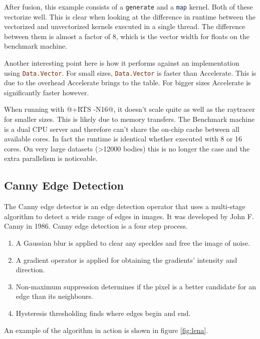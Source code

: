 \documentclass[a4paper,bibliography=totocnumbered,parskip,headsepline]{scrbook}
\begin{document}
After fusion, this example consists of a \lstinline[language=haskell]!generate! and a \lstinline[language=haskell]!map! kernel.
Both of these vectorize well.
This is clear when looking at the difference in runtime between the vectorized and unvectorized kernels executed in a single thread.
The difference between them is almost a factor of 8, which is the vector width for floats on the benchmark machine.

Another interesting point here is how it performs against an implementation using \lstinline[language=haskell]!Data.Vector!.
For small sizes, \lstinline[language=haskell]!Data.Vector! is faster than Accelerate.
This is due to the overhead Accelerate brings to the table.
For bigger sizes Accelerate is significantly faster however.

When running with @+RTS -N16@, it doesn't scale quite as well as the raytracer for smaller sizes.
This is likely due to memory transfers.
The Benchmark machine is a dual CPU server and therefore can't share the on-chip cache between all available cores.
In fact the runtime is identical whether executed with 8 or 16 cores.
On very large datasets (>12000 bodies) this is no longer the case and the extra parallelism is noticeable.

\subsection{Canny Edge Detection}
The Canny edge detector is an edge detection operator that uses a multi-stage algorithm to detect a wide range of edges in images.
It was developed by John F. Canny in 1986.
Canny edge detection is a four step process.
\begin{enumerate}
\item A Gaussian blur is applied to clear any speckles and free the image of noise.
\item A gradient operator is applied for obtaining the gradients' intensity and direction.
\item Non-maximum suppression determines if the pixel is a better candidate for an edge than its neighbours.
\item Hysteresis thresholding finds where edges begin and end.
\end{enumerate}

An example of the algorithm in action is shown in figure \ref{fig:lena}.
\end{document}
